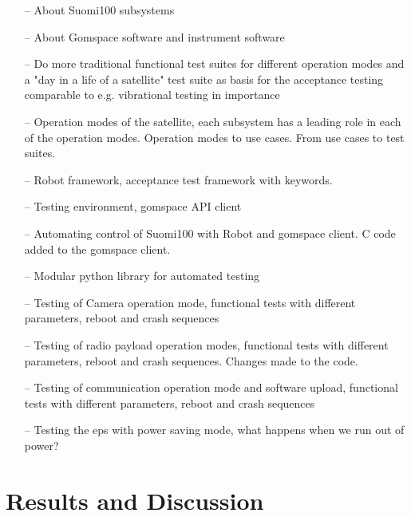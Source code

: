 \documentclass[english,12pt,a4paper,pdftex,elec,utf8]{aaltothesis}
\begin{document}
\begin{itemize}
\item[--]About Suomi100 subsystems
\item[--]About Gomspace software and instrument software
\item[--]Do more traditional functional test suites for different operation modes
and a "day in a life of a satellite" test suite as basis for the acceptance testing comparable to e.g. vibrational testing in importance
\item[--]Operation modes of the satellite, each subsystem has a leading role in each of the operation modes. Operation modes to use cases. From use cases to test suites.
\item[--]Robot framework, acceptance test framework with keywords.
\item[--]Testing environment, gomspace API client
\item[--]Automating control of Suomi100 with Robot and gomspace client. C code added to the gomspace client.
\item[--]Modular python library for automated testing
\item[--]Testing of Camera operation mode, functional tests with different parameters, reboot and crash sequences
\item[--]Testing of radio payload operation modes, functional tests with different parameters, reboot and crash sequences.
Changes made to the code.
\item[--]Testing of communication operation mode and software upload, functional tests with different parameters, reboot and crash sequences
\item[--]Testing the eps with power saving mode, what happens when we run out of power?
\end{itemize}
 

\clearpage

\section{Results and Discussion}
\end{document}
